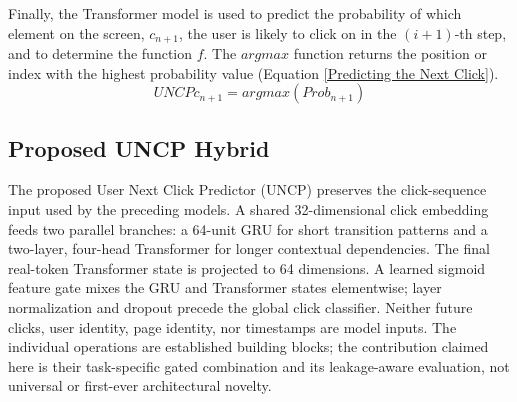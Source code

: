 \documentclass[sn-mathphys-num, Numbered]{sn-jnl}%
\theoremstyle{thmstyleone}%
\theoremstyle{thmstyletwo}%
\theoremstyle{thmstylethree}%
\providecommand{\DIFadd}[1]{{\protect\color{green!40!black}#1}} %
\providecommand{\DIFdel}[1]{}                      %
\providecommand{\DIFaddbegin}{} %
\providecommand{\DIFaddend}{} %
\providecommand{\DIFdelbegin}{} %
\providecommand{\DIFdelend}{} %
\newcommand{\DIFscaledelfig}{0.5}
\newlength{\DIFdelgraphicswidth} %
\newlength{\DIFdelgraphicsheight} %
\newcommand{\DIFaddincludegraphics}[2][]{{\color{blue}\fbox{\DIFOincludegraphics[#1]{#2}}}} %
\newcommand{\DIFdelincludegraphics}[2][]{%
\sbox{\DIFdelgraphicsbox}{\DIFOincludegraphics[#1]{#2}}%
\settoboxwidth{\DIFdelgraphicswidth}{\DIFdelgraphicsbox} %
\settoboxtotalheight{\DIFdelgraphicsheight}{\DIFdelgraphicsbox} %
\scalebox{\DIFscaledelfig}{%
\parbox[b]{\DIFdelgraphicswidth}{\usebox{\DIFdelgraphicsbox}\\[-\baselineskip] \rule{\DIFdelgraphicswidth}{0em}}\llap{\resizebox{\DIFdelgraphicswidth}{\DIFdelgraphicsheight}{%
\setlength{\unitlength}{\DIFdelgraphicswidth}%
\begin{picture}(1,1)%
\thicklines\linethickness{2pt} %
{\color[rgb]{1,0,0}\put(0,0){\framebox(1,1){}}}%
{\color[rgb]{1,0,0}\put(0,0){\line( 1,1){1}}}%
{\color[rgb]{1,0,0}\put(0,1){\line(1,-1){1}}}%
\end{picture}%
}\hspace*{3pt}}} %
} %
\DeclareRobustCommand{\DIFaddbegin}{\DIFOaddbegin \let\includegraphics\DIFaddincludegraphics} %
\DeclareRobustCommand{\DIFaddend}{\DIFOaddend \let\includegraphics\DIFOincludegraphics} %
\DeclareRobustCommand{\DIFdelbegin}{\DIFOdelbegin \let\includegraphics\DIFdelincludegraphics} %
\DeclareRobustCommand{\DIFdelend}{\DIFOaddend \let\includegraphics\DIFOincludegraphics} %
\begin{document}
Finally, the Transformer model is used to predict the probability of which element on the screen, $c_{n+1}$, the user is likely to click on in the $(i+1)$-th step, and to determine the function $f$. The $argmax$ function returns the position or index with the highest probability value (Equation \ref{Predicting the Next Click}).
\begin{equation}\label{Predicting the Next Click}
	UNCP{c_{n+1}} = argmax(Prob_{n+1})
\end{equation}


\subsection{\DIFdelbegin \DIFdel{Evaluation of the }\DIFdelend Proposed \DIFdelbegin \DIFdel{Method}\DIFdelend \DIFaddbegin \DIFadd{UNCP Hybrid}\DIFaddend }
\DIFdelbegin \DIFdel{Following the implementation of user next-click prediction modelsusing LSTMs and Transformers, the focus is shifting to leveraging these models to enhance UX. While traditional UX tests are vital for identifying software strengths and weaknesses, they suffer from limitations such as significant time consumption, }\DIFdelend \DIFaddbegin \DIFadd{The proposed User Next Click Predictor (UNCP) preserves the click-sequence input used by the preceding models. A shared 32-dimensional click embedding feeds two parallel branches: a 64-unit GRU for short transition patterns and a two-layer, four-head Transformer for longer contextual dependencies. The final real-token Transformer state is projected to 64 dimensions. A learned sigmoid feature gate mixes the GRU and Transformer states elementwise; layer normalization and dropout precede the global click classifier. Neither future clicks, user identity, page identity, nor timestamps are model inputs. The individual operations are established building blocks; the contribution claimed here is their task-specific gated combination and its leakage-aware evaluation, not universal or first-ever architectural novelty.
}
\end{document}
